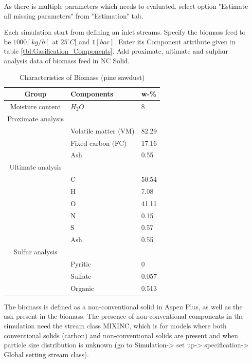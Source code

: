 As there is multiple parameters which needs to evaluated, select option "Estimate all missing parameters" from "Estimation" tab. 


Each simulation start from defining an inlet streams. Specify the biomass feed to be $1000 [kg/h]$ at $25 ^\circ C]$ and $1 [bar]$. Enter its Component attribute given in table \ref{tbl:Gasification_Components}. Add proximate, ultimate and sulphur analysis data of biomass feed in NC Solid.

\begin{table}[h!]
	\centering
	\begin{tabular}{cll}
			\hline
			Group				&	Components				&	w-\% 	\\ \hline 
			Moisture content	&	$H_2O$					&	8		\\ \hline
			\multicolumn{1}{c}{Proximate analysis}&\\
			\cline{1-1}
								&	Volatile matter (VM)	& 	82.29	\\
								& 	Fixed carbon (FC) 		& 	17.16  	\\
								&	Ash 					& 	0.55	\\ \hline
			\multicolumn{1}{c}{Ultimate  analysis}&\\
			\cline{1-1}
								& 	C 						&	50.54	\\
								&	H 						& 	7.08	\\
								&	O 						& 	41.11 	\\
								&	N 						& 	0.15	\\
								&	S 						& 	0.57	\\
								&	Ash 					&	0.55	\\ \hline
			\multicolumn{1}{c}{Sulfur  analysis}&\\
			\cline{1-1}
								&		Pyritic 			& 0			\\
								&		Sulfate 			& 0.057		\\
								&		Organic 			& 0.513		\\
			\hline
	\end{tabular}
	\caption{Characteristics of Biomass (pine sawdust)}
	\label{tbl:Biomass_Composition}
\end{table}

The biomass is defined as a non-conventional solid in Aspen Plus, as well as the ash present in the biomass. The presence of non-conventional components in the simulation need the stream class MIXINC, which is for models where both conventional solids (carbon) and non-conventional solids are present and when particle size distribution is unknown (go to Simulation-> set up-> specification-> Global setting stream class). 

